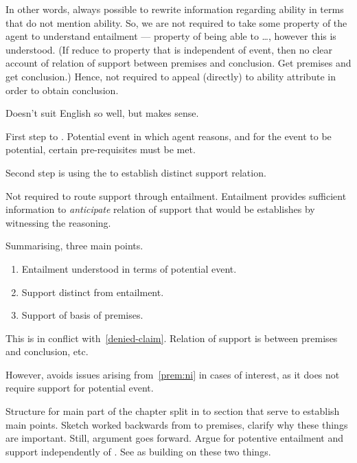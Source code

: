 \begin{note}
  In other words, always possible to rewrite information regarding ability in terms that do not mention ability.
  So, we are not required to take some property of the agent to understand entailment --- property of being able to \dots, however this is understood.
  (If reduce to property that is independent of event, then no clear account of relation of support between premises and conclusion.
  Get premises and get conclusion.)
  Hence, not required to appeal (directly) to ability attribute in order to obtain conclusion.

  Doesn't suit English so well, but makes sense.

  First step to \WR{}.
  Potential event in which agent reasons, and for the event to be potential, certain pre-requisites must be met.

  Second step is using the \gen{} to establish distinct support relation.

  Not required to route support through entailment.
  Entailment provides sufficient information to \emph{anticipate} relation of support that would be establishes by witnessing the reasoning.

  Summarising, three main points.
  \begin{enumerate}
  \item Entailment understood in terms of potential event.
  \item Support distinct from entailment.
  \item Support of basis of premises.
  \end{enumerate}

  This is in conflict with~\ref{denied-claim}.
  Relation of support is between premises and conclusion, etc.

  However, avoids issues arising from~\ref{prem:ni} in cases of interest, as it does not require support for potential event.

  Structure for main part of the chapter split in to section that serve to establish main points.
  Sketch worked backwards from \WR{} to premises, clarify why these things are important.
  Still, argument goes forward.
  Argue for potentive entailment and support independently of \WR{}.
  See \WR{} as building on these two things.
\end{note}

